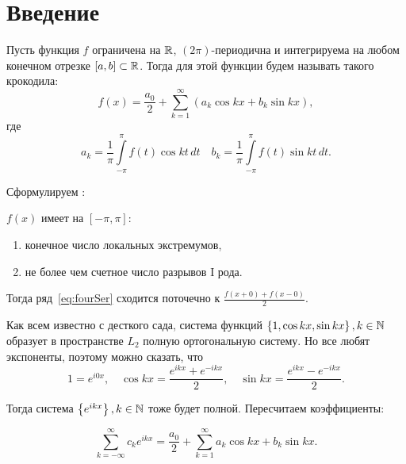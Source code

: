 \documentclass[main.tex]{subfiles}
\begin{document}
\section{Введение}

\begin{Def}\label{def:fourSer}
    Пусть функция $f$ ограничена на $\mathbb{R}$,  $(2\pi)$-периодична и
    интегрируема на любом конечном отрезке $[a, b] \subset \mathbb{R}$.
    Тогда  для этой функции будем называть такого крокодила:
    \begin{equation}\label{eq:fourSer}
        f(x) = \frac{a_0}{2} + \sum\limits_{k=1}^{\infty}
        (a_k \cos kx + b_k \sin kx)
    ,\end{equation}
    где
    \begin{equation}\label{eq:coeffFourSer}
        a_k = \frac{1}{\pi}\int\limits_{-\pi}^{\pi} f(t) \cos kt \,dt \quad
        b_k = \frac{1}{\pi}\int\limits_{-\pi}^{\pi} f(t) \sin kt \,dt 
    .\end{equation} 
\end{Def} 

Сформулируем :\\
\begin{Th}
    $f(x)$ имеет на $[-\pi, \pi]$:
\begin{enumerate}
    \item конечное число локальных экстремумов,
    \item не более чем счетное число разрывов I рода.
\end{enumerate} 
Тогда ряд~\eqref{eq:fourSer} сходится поточечно к $\frac{f(x + 0) + f(x - 0)}{2}$.
\end{Th}

Как всем известно с десткого сада, система функций
$\left\{ 1, \cos kx, \sin kx \right\}, k \in \mathbb{N}$ образует в пространстве
$L_2$ полную ортогональную систему.
Но все любят экспоненты, поэтому можно сказать, что
\begin{equation*}
    1 = e^{i0x}, \quad
    \cos kx = \frac{e^{ikx} + e^{-ikx}}{2}, \quad
    \sin kx = \frac{e^{ikx} - e^{-ikx}}{2}
.\end{equation*} 

Тогда система $\left\{ e^{ikx} \right\}, k \in \mathbb{N}$ тоже будет полной.
Пересчитаем коэффициенты:

\begin{equation*}
    \sum\limits_{k=-\infty}^{\infty} c_k e^{ikx} = \frac{a_0}{2} +
    \sum\limits_{k=1}^{\infty} a_k \cos kx + b_k \sin kx 
.\end{equation*} 
\end{document}
